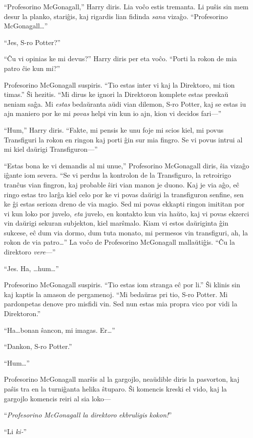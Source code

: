 ``Profesorino McGonagall,'' Harry diris. Lia voĉo estis tremanta. Li
puŝis sin mem desur la planko, stariĝis, kaj rigardis lian fidinda
\emph{sana} vizaĝo. ``Profesorino McGonagall\ldots''

``Jes, S-ro Potter?''

``Ĉu vi opinias ke mi devus?'' Harry diris per eta voĉo. ``Porti la
rokon de mia patro ĉie kun mi?''

Profesorino McGonagall suspiris. ``Tio estas inter vi kaj la
Direktoro, mi tion timas.'' Ŝi hezitis. ``Mi dirus ke ignori la
Direktoron komplete estas preskaŭ neniam saĝa. Mi \emph{estas}
bedaŭranta aŭdi vian dilemon, S-ro Potter, kaj se estas iu ajn maniero
por ke mi \emph{povas} helpi vin kun io ajn, kion vi decidos fari—''

``Hum,'' Harry diris. ``Fakte, mi pensis ke unu foje mi scios kiel, mi
povus Transfiguri la rokon en ringon kaj porti ĝin sur mia fingro. Se
vi povus intrui al mi kiel daŭrigi Transfiguron—'' 


``Estas bona ke vi demandis al mi unue,'' Profesorino McGonagall
diris, ŝia vizaĝo iĝante iom severa. ``Se vi perdus la kontrolon de la
Transfiguro, la retroirigo tranĉus vian fingron, kaj probable ŝiri
vian manon je duono. Kaj je via aĝo, eĉ ringo estas tro larĝa kiel
celo por ke vi povas daŭrigi la transfiguron senfine, sen ke ĝi estas
serioza dreno de via magio. Sed mi povas ekkapti ringon imititan por
vi kun loko por juvelo, \emph{eta} juvelo, en kontakto kun via haŭto,
kaj vi povas ekzerci vin daŭrigi sekuran subjekton, kiel
marŝmalo. Kiam vi estos daŭriginta ĝin sukcese, eĉ dum via dormo, dum
tuta monato, mi permesos vin transfiguri, ah, la rokon de via
patro\ldots'' La voĉo de Profesorino McGonagall mallaŭtiĝis. ``Ĉu la
direktoro \emph{vere}—''

``Jes. Ha, \ldots hum\ldots''

Profesorino McGonagall suspiris. ``Tio estas iom stranga eĉ por li.''
Ŝi klinis sin kaj kaptis la amason de pergamenoj. ``Mi bedaŭras pri
tio, S-ro Potter. Mi pardonpetas denove pro misfidi vin. Sed nun estas
mia propra vico por vidi la Direktoron.''

``Ha\ldots bonan ŝancon, mi imagas. Er\ldots''

``Dankon, S-ro Potter.''

``Hum\ldots''

Profesorino McGonagall marŝis al la gargojlo, neaŭdible diris la
pasvorton, kaj paŝis tra en la turniĝanta helika ŝtuparo. Ŝi komencis
kreski el vido, kaj la gargojlo komencis reiri al sia loko—

``\emph{Profesorino McGonagall la direktoro ekbruligis kokon!}''

``Li \emph{ki-}''




